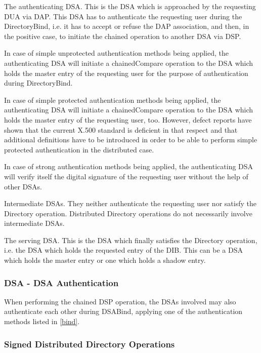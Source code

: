 \m The authenticating DSA. This is the DSA which is approached by the requesting 
   DUA via DAP. This DSA has to authenticate the requesting user during the 
   DirectoryBind, i.e. it has to accept or refuse the DAP association, and then, 
   in the positive case, to initiate the chained operation to another DSA via DSP. 
 
   In case of simple unprotected authentication methods being applied, the 
   authenticating DSA will initiate a chainedCompare operation to the DSA which 
   holds the master entry of the requesting user for the purpose of authentication
   during DirectoryBind.

   In case of simple protected authentication methods being applied, the 
   authenticating DSA will initiate a chainedCompare operation to the DSA which 
   holds the master entry of the requesting user, too. However, defect reports 
   have shown that the current X.500 standard is deficient in that respect and that 
   additional definitions have to be introduced in order to be able to perform simple 
   protected authentication in the distributed case.

   In case of strong authentication methods being applied, the authenticating DSA
   will verify itself the digital signature of the requesting user without the
   help of other DSAs. 
   
\m Intermediate DSAs. They neither authenticate the requesting user nor satisfy 
   the Directory operation. Distributed Directory operations do not necessarily
   involve intermediate DSAs.

\m The serving DSA. This is the DSA which finally satisfies the Directory operation, 
   i.e. the DSA which holds the requested entry of the DIB. This can be a DSA which 
   holds the master entry or one which holds a shadow entry.
\ee

\subsubsection{DSA - DSA Authentication}


When performing the chained DSP operation, the DSAs involved  may also authenticate
each other during DSABind, applying one of the authentication methods listed in 
\ref{bind}.

\subsubsection{Signed Distributed Directory Operations}


